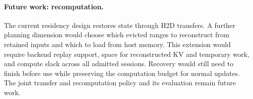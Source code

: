 \paragraph{Future work: recomputation.}
The current residency design restores state through H2D transfers.
A further planning dimension would choose which evicted ranges to reconstruct from retained inputs and which to load from host memory.
This extension would require backend replay support, space for reconstructed KV and temporary work, and compute slack across all admitted sessions.
Recovery would still need to finish before use while preserving the computation budget for normal updates.
The joint transfer and recomputation policy and its evaluation remain future work.
